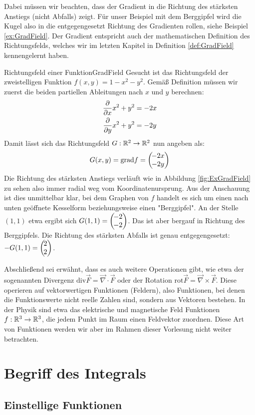 Dabei müssen wir beachten, dass der Gradient in die Richtung des stärksten Anstiegs (nicht Abfalls) zeigt. Für unser Beispiel mit dem Berggipfel wird die Kugel also in die entgegengesetzt Richtung des Gradienten rollen, siehe Beispiel \ref{ex:GradField}. Der Gradient entspricht auch der mathematischen Definition des Richtungsfelds, welches wir im letzten Kapitel in Definition \ref{def:GradField} kennengelernt haben.

\begin{example}{Richtungsfeld einer Funktion}{GradField}
	Gesucht ist das Richtungsfeld der zweistelligen Funktion $f(x,y) = 1-x^2-y^2$. Gemäß Definition müssen wir zuerst die beiden partiellen Ableitungen nach $x$ und $y$ berechnen:
	\begin{alignat*}{1}
	\frac{\partial }{\partial x} x^2+y^2 &= -2x \\
	\frac{\partial }{\partial y} x^2+y^2 &= -2y
	\end{alignat*}
	Damit lässt sich das Richtungsfeld $G: \mathbb{R}^2 \to \mathbb{R}^2$ nun angeben als:
	$$
	G(x,y) = \text{grad} f = \left(\negthinspace\begin{matrix}-2x\\-2y\end{matrix}\right)
	$$
	Die Richtung des stärksten Anstiegs verläuft wie in Abbildung \ref{fig:ExGradField} zu sehen also immer radial weg vom Koordinatenursprung. Aus der Anschauung ist dies unmittelbar klar, bei dem Graphen von $f$ handelt es sich um einen nach unten geöffnete Kesselform beziehungsweise einen "Berggipfel". An der Stelle $(1,1)$ etwa ergibt sich $G(1,1) = \left(\negthinspace\begin{matrix}-2\\-2\end{matrix}\right)$. Das ist aber bergauf in Richtung des Berggipfels. Die Richtung des stärksten Abfalls ist genau entgegengesetzt: $-G(1,1) = \left(\negthinspace\begin{matrix}2\\2\end{matrix}\right)$. 	
\end{example}

Abschließend sei erwähnt, dass es auch weitere Operationen gibt, wie etwa der sogenannten Divergenz $\text{div} \vec{F} = \vec{\nabla} \cdot \vec{F}$ oder der Rotation $\text{rot} \vec{F} = \vec{\nabla} \times \vec{F}$. Diese operieren auf vektorwertigen Funktionen (Feldern), also Funktionen, bei denen die Funktionswerte nicht reelle Zahlen sind, sondern aus Vektoren bestehen. In der Physik sind etwa das elektrische und magnetische Feld Funktionen $f: \mathbb{R}^3 \to \mathbb{R}^3$, die jedem Punkt im Raum einen Feldvektor zuordnen. Diese Art von Funktionen werden wir aber im Rahmen dieser Vorlesung nicht weiter betrachten.

\section{Begriff des Integrals}

\subsection{Einstellige Funktionen}

